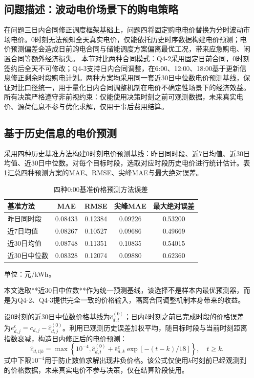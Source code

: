 \subsection{问题描述：波动电价场景下的购电策略}
在问题三日内合同修正调度框架基础上，问题四将固定购电电价替换为分时波动市场电价。0时刻无法预知全天真实电价，仅能依托历史时序数据构建电价预测；电价预测偏差会造成日前购电合同与储能调度方案偏离最优工况，带来应急购电、闲置合同等额外经济损失。
本节对比两种合同模式：Q4-2采用固定日前合同，0时刻签约后全天不可修改；Q4-3支持日内合同调整，在6:00、12:00、18:00基于更新信息修正剩余时段购电计划。两种方案均采用同一套近30日中位数电价预测基线，保证对比口径统一，用于量化日内合同调整机制在电价不确定性场景下的经济效益。所有决策严格遵守非前视约束：仅能使用决策时刻之前可观测数据，未来真实电价、源荷信息不参与优化求解，仅用于事后费用结算。

\subsection{基于历史信息的电价预测}
采用四种历史基准方法构建0时刻电价预测基线：昨日同时段、近7日均值、近30日均值、近30日中位数。对每个目标时段，选取对应时段历史电价进行统计估计。表\ref{tab:q4_price_pred_err}汇总四种预测方案的MAE、RMSE、尖峰MAE与最大绝对误差。

\begin{table}[htbp]
\centering
\caption{四种0:00基准价格预测方法误差}
\label{tab:q4_price_pred_err}
\begin{tabular}{lcccc}
\toprule
基准方法 & MAE & RMSE & 尖峰MAE & 最大绝对误差 \\
\midrule
昨日同时段 & 0.08433 & 0.12384 & 0.09226 & 0.53200 \\
近7日均值 & 0.08267 & 0.10527 & 0.09686 & 0.49669 \\
近30日均值 & 0.08748 & 0.11351 & 0.10835 & 0.54015 \\
近30日中位数 & 0.08328 & 0.12074 & 0.09880 & 0.62360 \\
\bottomrule
\end{tabular}
\footnotesize{单位：元/kWh。}
\end{table}

本文选取**近30日中位数**作为统一预测基线，该选择不是样本内最优预测器，而是为Q4-2、Q4-3提供完全一致的价格输入，隔离合同调整机制本身带来的收益。

设0时刻的近30日中位数价格基线为$\hat{c}_{d,t}^{(0)}$；日内$k$时刻之前已完成时段的价格误差为$e_{d,j}^c = c_{d,j}-\hat{c}_{d,j}^{(0)}$。利用已观测历史误差加权平均，随目标时段与当前时刻距离指数衰减，构造日内修正后的电价预测：
\begin{equation}
\hat{c}_{d,t|k} = \max\left\{10^{-4},\hat{c}_{d,t}^{(0)} + \bar{e}_{d,k}^c \exp\left[-(t-k)/18\right]\right\},\quad t \ge k.
\label{eq:q4_price_update}
\end{equation}
式中下限$10^{-4}$用于防止数值求解出现非负价格。该公式仅使用$k$时刻前已经观测到的价格数据，未来真实电价不参与决策，仅在结算阶段使用。

